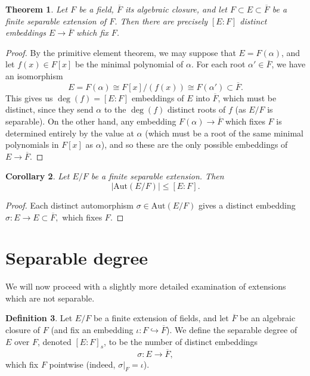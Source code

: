 \documentclass[12pt]{report}
\newtheorem{thm}{Theorem}[section]
\newtheorem{cor}[thm]{Corollary}
\theoremstyle{definition}
\newtheorem{defn}[thm]{Definition}
\def\Aut{\text{Aut}}
\def\aa{\alpha}
\begin{document}
\begin{thm}\label{acc}
    Let $F$ be a field, $\overline{F}$ its algebraic closure, and let $F \subset E \subset \overline{F}$ be a finite separable extension of $F$. Then there are precisely $[E:F]$ distinct embeddings $E\to \overline{F}$ which fix $F$.
\end{thm}

\begin{proof}
    By the primitive element theorem, we may suppose that $E = F(\aa)$, and let $f(x) \in F[x]$ be the minimal polynomial of $\aa$. For each root $\aa' \in \overline{F}$, we have an isomorphism $$E = F(\aa) \cong F[x]/(f(x)) \cong F(\aa') \subset \overline{F}.$$
    This gives us $\deg(f) = [E:F]$ embeddings of $E$ into $\overline{F}$, which must be distinct, since they send $\aa$ to the $\deg(f)$ distinct roots of $f$ (as $E/F$ is separable). 
    On the other hand, any embedding $F(\aa) \to \overline{F}$ which fixes $F$ is determined entirely by the value at $\aa$ (which must be a root of the same minimal polynomials in $F[x]$ as $\aa$), and so these are the only possible embeddings of $E \to \overline{F}$.
\end{proof}

\begin{cor}\label{cor1}
    Let $E/F$ be a finite separable extension. Then
     $$|\Aut(E/F)| \leq [E:F].$$
\end{cor}

\begin{proof}
    Each distinct automorphism $\sigma\in\Aut(E/F)$ gives a distinct embedding $\sigma : E \to E \subset \overline{F},$ which fixes $F$.
\end{proof}

\section{Separable degree}

We will now proceed with a slightly more detailed examination of extensions which are not separable.

\begin{defn}
    Let $E/F$ be a finite extension of fields, and let $\overline{F}$ be an algebraic closure of $F$ (and fix an embedding $\iota: F\hookrightarrow\overline{F}$). We define the separable degree of $E$ over $F$, denoted $[E : F]_s$, to be the number of distinct embeddings $$\sigma: E\to \overline{F},$$ which fix $F$ pointwise (indeed, $\sigma|_F=\iota$).
\end{defn}
\end{document}
